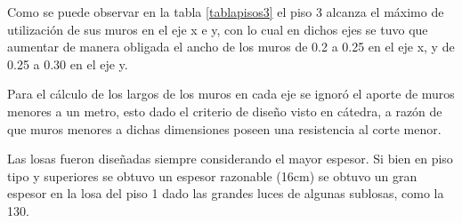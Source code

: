 \documentclass[letterpaper,11pt]{article} %
\begin{document}
Como se puede observar en la tabla \ref{tablapisos3} el piso 3 alcanza el máximo de utilización de sus muros en el eje x e y, con lo cual en dichos ejes se tuvo que aumentar de manera obligada el ancho de los muros de 0.2 a 0.25 en el eje x, y de 0.25 a 0.30 en el eje y.

\newp Para el cálculo de los largos de los muros en cada eje se ignoró el aporte de muros menores a un metro, esto dado el criterio de diseño visto en cátedra, a razón de que muros menores a dichas dimensiones poseen una resistencia al corte menor.

\newp Las losas fueron diseñadas siempre considerando el mayor espesor. Si bien en piso tipo y superiores se obtuvo un espesor razonable (16cm) se obtuvo un gran espesor en la losa del piso 1 dado las grandes luces de algunas sublosas, como la 130.


\end{document}
